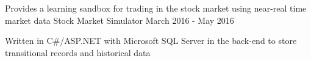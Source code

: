 \begin{cventries}
  \cventry
    {Provides a learning sandbox for trading in the stock market using near-real time market data} %
    {Stock Market Simulator} %
    {} %
    {March 2016 - May 2016} %
    {
      \begin{cvitems} %
        \item {Written in C\#/ASP.NET with Microsoft SQL Server in the back-end to store transitional records and historical data}
      \end{cvitems}
    }

\end{cventries}
